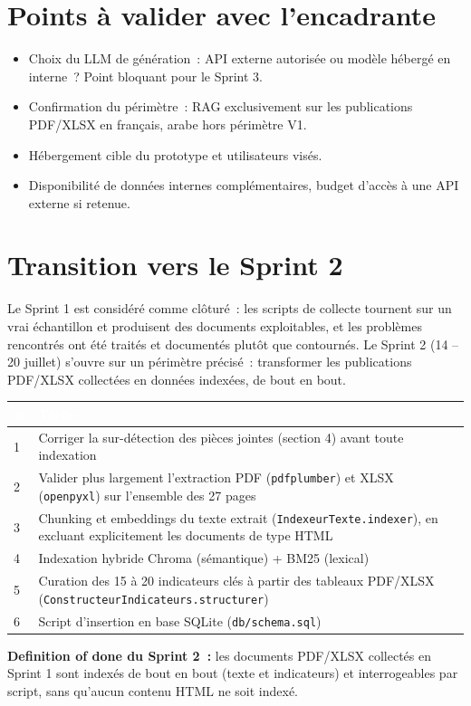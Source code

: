\documentclass[11pt,a4paper]{article}
\newcommand{\tblhead}[1]{\textcolor{white}{\textbf{#1}}}
\begin{document}
\section{Points \`a valider avec l'encadrante}
\begin{itemize}
\item Choix du LLM de g\'en\'eration~: API externe autoris\'ee ou mod\`ele h\'eberg\'e en interne~? Point bloquant pour le Sprint 3.
\item Confirmation du p\'erim\`etre~: RAG exclusivement sur les publications PDF/XLSX en fran\c{c}ais, arabe hors p\'erim\`etre V1.
\item H\'ebergement cible du prototype et utilisateurs vis\'es.
\item Disponibilit\'e de donn\'ees internes compl\'ementaires, budget d'acc\`es \`a une API externe si retenue.
\end{itemize}

\section{Transition vers le Sprint 2}
Le Sprint 1 est consid\'er\'e comme cl\^otur\'e~: les scripts de collecte tournent sur un vrai \'echantillon et produisent des documents exploitables, et les probl\`emes rencontr\'es ont \'et\'e trait\'es et document\'es plut\^ot que contourn\'es. Le Sprint 2 (14 -- 20 juillet) s'ouvre sur un p\'erim\`etre pr\'ecis\'e~: transformer les publications PDF/XLSX collect\'ees en donn\'ees index\'ees, de bout en bout.

\begin{longtable}{@{}p{1cm}p{14.5cm}@{}}
\rowcolor{navy}
\tblhead{\#} & \tblhead{T\^ache} \\
\midrule
\endhead
1 & Corriger la sur-d\'etection des pi\`eces jointes (section 4) avant toute indexation \\
2 & Valider plus largement l'extraction PDF (\texttt{pdfplumber}) et XLSX (\texttt{openpyxl}) sur l'ensemble des 27 pages \\
3 & Chunking et embeddings du texte extrait (\texttt{IndexeurTexte.indexer}), en excluant explicitement les documents de type HTML \\
4 & Indexation hybride Chroma (s\'emantique) + BM25 (lexical) \\
5 & Curation des 15 \`a 20 indicateurs cl\'es \`a partir des tableaux PDF/XLSX (\texttt{ConstructeurIndicateurs.structurer}) \\
6 & Script d'insertion en base SQLite (\texttt{db/schema.sql}) \\
\end{longtable}

\textbf{Definition of done du Sprint 2~:} les documents PDF/XLSX collect\'es en Sprint 1 sont index\'es de bout en bout (texte et indicateurs) et interrogeables par script, sans qu'aucun contenu HTML ne soit index\'e.
\end{document}
